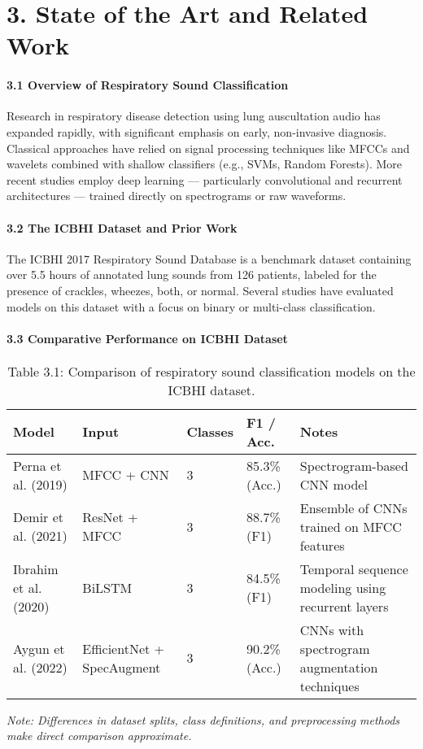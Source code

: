\section*{3. State of the Art and Related Work}
\paragraph{3.1 Overview of Respiratory Sound Classification\\}
Research in respiratory disease detection using lung auscultation audio has expanded rapidly, with significant emphasis on early, non-invasive diagnosis. Classical approaches have relied on signal processing techniques like MFCCs and wavelets combined with shallow classifiers (e.g., SVMs, Random Forests). More recent studies employ deep learning — particularly convolutional and recurrent architectures — trained directly on spectrograms or raw waveforms.
\paragraph{3.2 The ICBHI Dataset and Prior Work\\}
The ICBHI 2017 Respiratory Sound Database is a benchmark dataset containing over 5.5 hours of annotated lung sounds from 126 patients, labeled for the presence of crackles, wheezes, both, or normal. Several studies have evaluated models on this dataset with a focus on binary or multi-class classification.
\paragraph{3.3 Comparative Performance on ICBHI Dataset\\}
\begin{table}[h!]
\centering
\small
\renewcommand{\arraystretch}{1.2}
\begin{tabular}{|p{3.2cm}|p{2.2cm}|p{1.5cm}|p{2.2cm}|p{4cm}|}
\hline
\textbf{Model} & \textbf{Input} & \textbf{Classes} & \textbf{F1 / Acc.} & \textbf{Notes} \\
\hline
Perna et al. (2019) & MFCC + CNN & 3 & 85.3\% (Acc.) & Spectrogram-based CNN model \\
Demir et al. (2021) & ResNet + MFCC & 3 & 88.7\% (F1) & Ensemble of CNNs trained on MFCC features \\
Ibrahim et al. (2020) & BiLSTM & 3 & 84.5\% (F1) & Temporal sequence modeling using recurrent layers \\
Aygun et al. (2022) & EfficientNet + SpecAugment & 3 & 90.2\% (Acc.) & CNNs with spectrogram augmentation techniques \\
\hline
\end{tabular}
\caption*{Table 3.1: Comparison of respiratory sound classification models on the ICBHI dataset.}
\label{tab:icbhi_comparison}
\end{table}
\vspace{0.5em}
\textit{Note: Differences in dataset splits, class definitions, and preprocessing methods make direct comparison approximate.}
